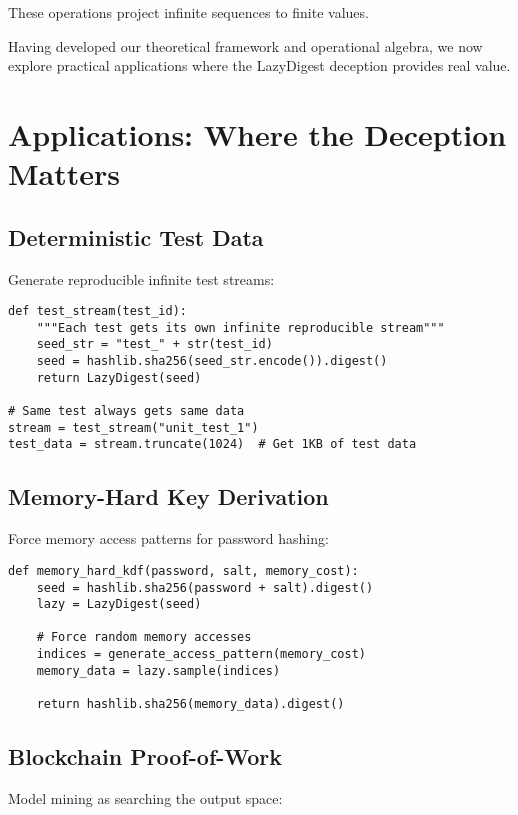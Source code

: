 \documentclass[11pt]{article}
\begin{document}
These operations project infinite sequences to finite values.

Having developed our theoretical framework and operational algebra, we now explore practical applications where the LazyDigest deception provides real value.

\section{Applications: Where the Deception Matters}

\subsection{Deterministic Test Data}

Generate reproducible infinite test streams:

\begin{lstlisting}
def test_stream(test_id):
    """Each test gets its own infinite reproducible stream"""
    seed_str = "test_" + str(test_id)
    seed = hashlib.sha256(seed_str.encode()).digest()
    return LazyDigest(seed)

# Same test always gets same data
stream = test_stream("unit_test_1")
test_data = stream.truncate(1024)  # Get 1KB of test data
\end{lstlisting}

\subsection{Memory-Hard Key Derivation}

Force memory access patterns for password hashing:

\begin{lstlisting}
def memory_hard_kdf(password, salt, memory_cost):
    seed = hashlib.sha256(password + salt).digest()
    lazy = LazyDigest(seed)
    
    # Force random memory accesses
    indices = generate_access_pattern(memory_cost)
    memory_data = lazy.sample(indices)
    
    return hashlib.sha256(memory_data).digest()
\end{lstlisting}

\subsection{Blockchain Proof-of-Work}

Model mining as searching the output space:
\end{document}
